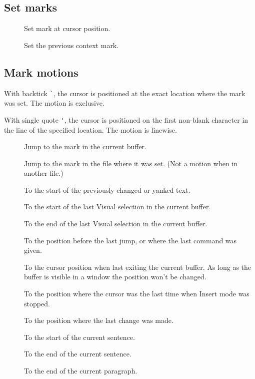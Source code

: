 \subsection{Set marks}
\begin{description}
  \item[] Set mark at cursor position. 
  \item[] Set the previous context mark.
\end{description}
\subsection{Mark motions}
    With backtick \verb|`|, the cursor is positioned at the exact location where the mark was set. The motion is exclusive.

    With single quote \verb|'|, the cursor is positioned on the first non-blank character in the line of the specified location. The motion is linewise.
\begin{description}
  \item[] Jump to the mark in the current buffer.
  \item[] Jump to the mark in the file where it was set. (Not a motion when in another file.) 
  \item[\PVerb{'[, `[}] To the start of the previously changed or yanked text.
  \item[] To the start of the last Visual selection in the current buffer.
  \item[] To the end of the last Visual selection in the current buffer.
  \item[] To the position before the last jump, or where the last  command was given.
  \item[] To the cursor position when last exiting the current buffer. As long as the buffer is visible in a window the position won't be changed. 
  \item[] To the position where the cursor was the last time when Insert mode was stopped.
  \item[] To the position where the last change was made.
  \item[] To the start of the current sentence.
  \item[] To the end of the current sentence.
  \item[\PVerb{'{, `{}] To the start of the current paragraph.
  \item[\PVerb{'}, `}}] To the end of the current paragraph.
\end{description}
